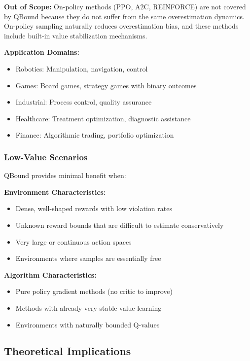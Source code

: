 \documentclass[11pt]{article}
\theoremstyle{definition}
\theoremstyle{remark}
\begin{document}
\textbf{Out of Scope:} On-policy methods (PPO, A2C, REINFORCE) are not covered by QBound because they do not suffer from the same overestimation dynamics. On-policy sampling naturally reduces overestimation bias, and these methods include built-in value stabilization mechanisms.

\textbf{Application Domains:}
\begin{itemize}
    \item Robotics: Manipulation, navigation, control
    \item Games: Board games, strategy games with binary outcomes
    \item Industrial: Process control, quality assurance
    \item Healthcare: Treatment optimization, diagnostic assistance
    \item Finance: Algorithmic trading, portfolio optimization
\end{itemize}

\subsubsection{Low-Value Scenarios}

QBound provides minimal benefit when:

\textbf{Environment Characteristics:}
\begin{itemize}
    \item Dense, well-shaped rewards with low violation rates
    \item Unknown reward bounds that are difficult to estimate conservatively
    \item Very large or continuous action spaces
    \item Environments where samples are essentially free
\end{itemize}

\textbf{Algorithm Characteristics:}
\begin{itemize}
    \item Pure policy gradient methods (no critic to improve)
    \item Methods with already very stable value learning
    \item Environments with naturally bounded Q-values
\end{itemize}

\subsection{Theoretical Implications}
\end{document}
